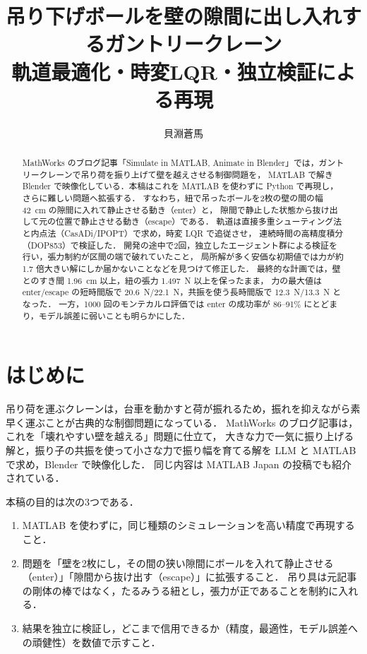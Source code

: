 \documentclass[a4paper,10pt]{ltjsarticle}
\title{吊り下げボールを壁の隙間に出し入れするガントリークレーン\\
軌道最適化・時変LQR・独立検証による再現}
\author{貝淵蒼馬}
\date{}
\begin{document}
\maketitle

\begin{abstract}
MathWorks のブログ記事「Simulate in MATLAB, Animate in Blender」では，ガントリークレーンで吊り荷を振り上げて壁を越えさせる制御問題を，
MATLAB で解き Blender で映像化している．本稿はこれを MATLAB を使わずに Python で再現し，さらに難しい問題へ拡張する．
すなわち，紐で吊ったボールを2枚の壁の間の幅 \SI{42}{cm} の隙間に入れて静止させる動き（enter）と，
隙間で静止した状態から抜け出して元の位置で静止させる動き（escape）である．
軌道は直接多重シューティング法と内点法（CasADi/IPOPT）で求め，時変 LQR で追従させ，
連続時間の高精度積分（DOP853）で検証した．
開発の途中で2回，独立したエージェント群による検証を行い，張力制約が区間の端で破れていたこと，
局所解が多く安価な初期値では力が約 1.7 倍大きい解にしか届かないことなどを見つけて修正した．
最終的な計画では，壁とのすき間 \SI{1.96}{cm} 以上，紐の張力 \SI{1.497}{N} 以上を保ったまま，
力の最大値は enter/escape の短時間版で \SI{20.6}{N}/\SI{22.1}{N}，共振を使う長時間版で \SI{12.3}{N}/\SI{13.3}{N} となった．
一方，1000 回のモンテカルロ評価では enter の成功率が 86--91\% にとどまり，モデル誤差に弱いことも明らかにした．
\end{abstract}

\section{はじめに}

吊り荷を運ぶクレーンは，台車を動かすと荷が振れるため，振れを抑えながら素早く運ぶことが古典的な制御問題になっている．
MathWorks のブログ記事\cite{gulley2026}は，これを「壊れやすい壁を越える」問題に仕立て，
大きな力で一気に振り上げる解と，振り子の共振を使って小さな力で振り幅を育てる解を LLM と MATLAB で求め，Blender で映像化した．
同じ内容は MATLAB Japan の投稿\cite{matlabjp2026}でも紹介されている．

本稿の目的は次の3つである．
\begin{enumerate}
  \item MATLAB を使わずに，同じ種類のシミュレーションを高い精度で再現すること．
  \item 問題を「壁を2枚にし，その間の狭い隙間にボールを入れて静止させる（enter）」「隙間から抜け出す（escape）」に拡張すること．
        吊り具は元記事の剛体の棒ではなく，たるみうる紐とし，張力が正であることを制約に入れる．
  \item 結果を独立に検証し，どこまで信用できるか（精度，最適性，モデル誤差への頑健性）を数値で示すこと．
\end{enumerate}
\end{document}
